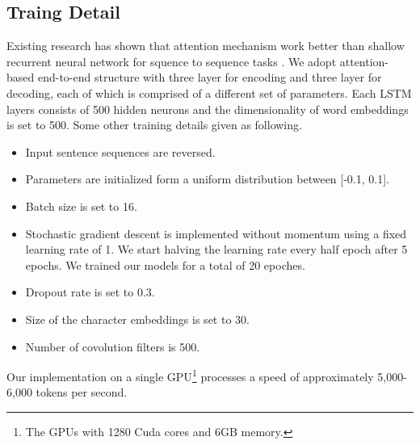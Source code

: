 \documentclass[letterpaper]{article}
\begin{document}
\subsection{Traing Detail}
Existing research has shown that attention mechanism work better than shallow recurrent neural network for squence to sequence tasks \cite{luong-pham-manning:2015:EMNLP,Sutskever:2014:SSL:2969033.2969173}. We adopt attention-based end-to-end structure with three layer for encoding and three layer for decoding, each of which is comprised of a different set of parameters. Each LSTM layers consists of 500 hidden neurons and the dimensionality of word embeddings is set to 500. Some other training details given as following.

\begin{itemize}	
	\item Input sentence sequences are reversed.
	\item Parameters are initialized form a uniform distribution between [-0.1, 0.1].
	\item Batch size is set to 16.
	\item Stochastic gradient descent is implemented without momentum using a fixed learning rate of 1. We start halving the learning rate every half epoch after 5 epochs. We trained our models for a total of 20 epoches.
	\item Dropout rate is set to 0.3.
	\item Size of the character embeddings is set to 30.
	\item Number of covolution filters is 500.
\end{itemize}

Our implementation on a single GPU\footnote{The GPUs with 1280 Cuda cores and 6GB memory.} processes a speed of approximately 5,000-6,000 tokens per second.
\end{document}
